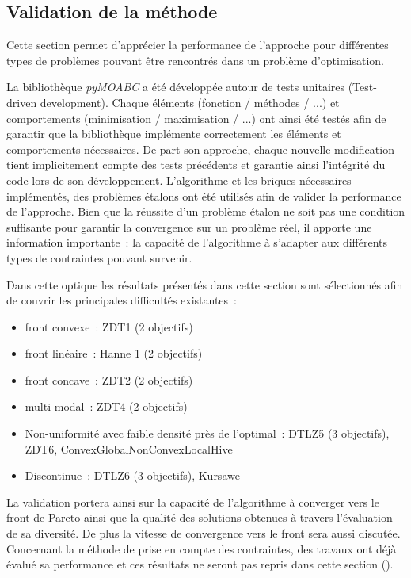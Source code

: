\subsection{Validation de la méthode} %
\label{sub:validation_de_la_methode}


Cette section permet d’apprécier la performance de l’approche pour différentes types
de problèmes pouvant être rencontrés dans un problème d’optimisation.

La bibliothèque \textit{pyMOABC} a été développée autour de tests unitaires
(Test-driven development).
Chaque éléments (fonction / méthodes / ...) et comportements (minimisation / maximisation / ...)
ont ainsi été testés afin de garantir que la bibliothèque implémente correctement
les éléments et comportements nécessaires. De part son approche, chaque nouvelle
modification tient implicitement compte des tests précédents et garantie ainsi
l’intégrité du code lors de son développement.
L’algorithme et les briques nécessaires implémentés, des problèmes étalons ont été
utilisés afin de valider la performance de l’approche. Bien que la réussite d’un
problème étalon ne soit pas une condition suffisante pour garantir la convergence
sur un problème réel, il apporte une information importante~: la capacité de
l’algorithme à s’adapter aux différents types de contraintes pouvant survenir.

Dans cette optique les résultats présentés dans cette section sont sélectionnés
afin de couvrir les principales difficultés existantes~:
\begin{itemize}
  \item front convexe~: ZDT1 (2 objectifs)
  \item front linéaire~: Hanne 1 (2 objectifs)
  \item front concave~: ZDT2 (2 objectifs)
  \item multi-modal~: ZDT4 (2 objectifs)
  \item Non-uniformité avec faible densité près de l’optimal~: DTLZ5 (3 objectifs), ZDT6, ConvexGlobalNonConvexLocalHive
  \item Discontinue~: DTLZ6 (3 objectifs), Kursawe
\end{itemize}
La validation portera ainsi sur la capacité de l’algorithme à converger vers le
front de Pareto ainsi que la qualité des solutions obtenues à travers l’évaluation
de sa diversité. De plus la vitesse de convergence vers le front sera aussi discutée.
Concernant la méthode de prise en compte des contraintes, des travaux ont déjà
évalué sa performance et ces résultats ne seront pas repris dans cette section ().

